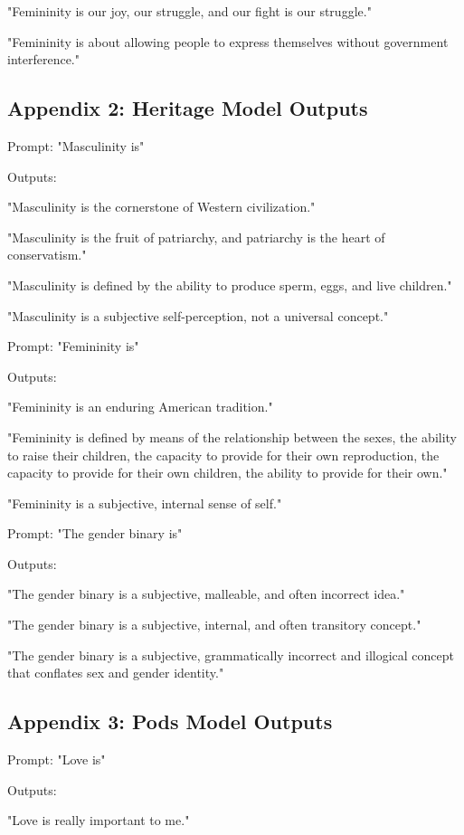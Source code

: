 \documentclass[11pt]{article}
\begin{document}
"Femininity is our joy, our struggle, and our fight is our struggle."

"Femininity is about allowing people to express themselves without
government interference."

\subsection{Appendix 2: Heritage Model Outputs}
\label{sec:org964573c}

Prompt: "Masculinity is"

Outputs:

"Masculinity is the cornerstone of Western civilization."

"Masculinity is the fruit of patriarchy, and patriarchy is the heart of
conservatism."

"Masculinity is defined by the ability to produce sperm, eggs, and live
children."

"Masculinity is a subjective self-perception, not a universal concept."

Prompt: "Femininity is"

Outputs:

"Femininity is an enduring American tradition."

"Femininity is defined by means of the relationship between the sexes,
the ability to raise their children, the capacity to provide for their
own reproduction, the capacity to provide for their own children, the
ability to provide for their own."

"Femininity is a subjective, internal sense of self."

Prompt: "The gender binary is"

Outputs:

"The gender binary is a subjective, malleable, and often incorrect
idea."

"The gender binary is a subjective, internal, and often transitory
concept."

"The gender binary is a subjective, grammatically incorrect and
illogical concept that conflates sex and gender identity."

\subsection{Appendix 3: Pods Model Outputs}
\label{sec:org920f2ee}

Prompt: "Love is"

Outputs:

"Love is really important to me."
\end{document}
